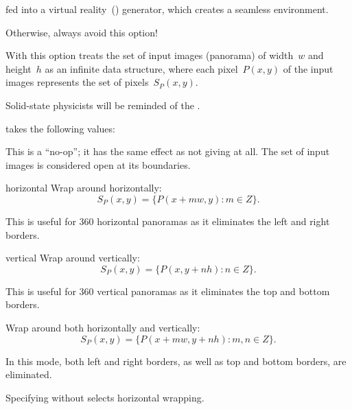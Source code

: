\begin{codelist}
\begin{compactitemize}
  \item
    fed into a virtual reality~() generator, which creates a seamless environment.
  \end{compactitemize}

  \noindent Otherwise, always avoid this option!

  With this option \App{} treats the set of input images (panorama) of width~$w$ and height~$h$
  as an infinite data structure, where each pixel~$P(x, y)$ of the input images represents the
  set of pixels~$S_P(x, y)$.

  \begin{geeknote}
    Solid-state physicists will be reminded of the
    .
  \end{geeknote}

   takes the following values:

  \begin{codelist}
  \item[\itempar{none \\ open}]\itemend
    This is a ``no-op''; it has the same effect as not giving  at all.  The set
    of input images is considered open at its boundaries.

  \item[horizontal]\itemend
    Wrap around horizontally:
    \[
    S_P(x, y) = \{P(x + m w, y): m \in Z\}.
    \]

    This is useful for 360\angulardegree{} horizontal panoramas as it eliminates the left and
    right borders.

  \item[vertical]\itemend
    Wrap around vertically:
    \[
    S_P(x, y) = \{P(x, y + n h): n \in Z\}.
    \]

    This is useful for 360\angulardegree{} vertical panoramas as it eliminates the top and
    bottom borders.

  \item[\itempar{both \\ horizontal+vertical
      \\ vertical+horizontal}]\itemend
    Wrap around both horizontally and vertically:
    \[
    S_P(x, y) = \{P(x + m w, y + n h): m, n \in Z\}.
    \]

    In this mode, both left and right borders, as well as top and bottom borders, are
    eliminated.
  \end{codelist}

  Specifying  without  selects horizontal
  wrapping.
\end{codelist}



